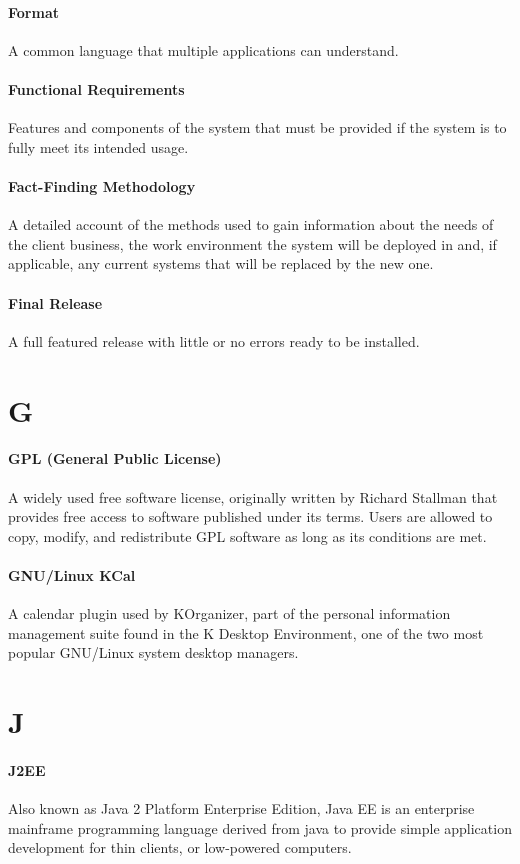 \documentclass[letterpaper,12pt]{report}
\begin{document}
\paragraph{Format} A common language that multiple applications can understand. 
\paragraph{Functional Requirements} Features and components of the system that must be provided if the system is to fully meet its intended usage.
\paragraph{Fact-Finding Methodology} A detailed account of the methods used to gain information about the needs of the client business, the work environment the system will be deployed in and, if applicable, any current systems that will be replaced by the new one.
\paragraph{Final Release} A full featured release with little or no errors ready to be installed.
\section*{G}
\paragraph{GPL (General Public License)} A widely used free software license, originally written by Richard Stallman that provides free access to software published under its terms. Users are allowed to copy, modify, and redistribute GPL software as long as its conditions are met.
\paragraph{GNU/Linux KCal} A calendar plugin used by KOrganizer, part of the personal information management suite found in the K Desktop Environment, one of the two most popular GNU/Linux system desktop managers.
\section*{J}
\paragraph{J2EE} Also known as Java 2 Platform Enterprise Edition, Java EE is an enterprise mainframe programming language derived from java to provide simple application development for thin clients, or low-powered computers.
\end{document}
